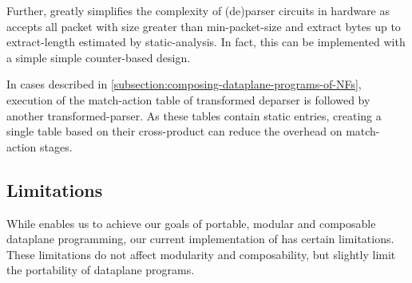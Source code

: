 \documentclass[letterpaper,twocolumn,10pt]{article}
\begin{document}
Further, \ucomp greatly simplifies the complexity of (de)parser
circuits in hardware as \ucomp accepts all packet with size greater
than min-packet-size and extract bytes up to extract-length estimated
by static-analysis. In fact, this can be implemented with a simple
simple counter-based design.


 In cases described in
\cref{subsection:composing-dataplane-programs-of-NFs}, execution of
the match-action table of transformed deparser is followed by another
transformed-parser. As these tables contain static entries, creating a
single table based on their cross-product can reduce the overhead on
match-action stages.









\subsection{Limitations}
\label{sec:limitations}
While \ulang enables us to achieve our goals of portable, modular and
composable dataplane programming, our current implementation of \ucomp
has certain limitations. These limitations do not affect modularity
and composability, but slightly limit the portability of dataplane
programs.
\end{document}
